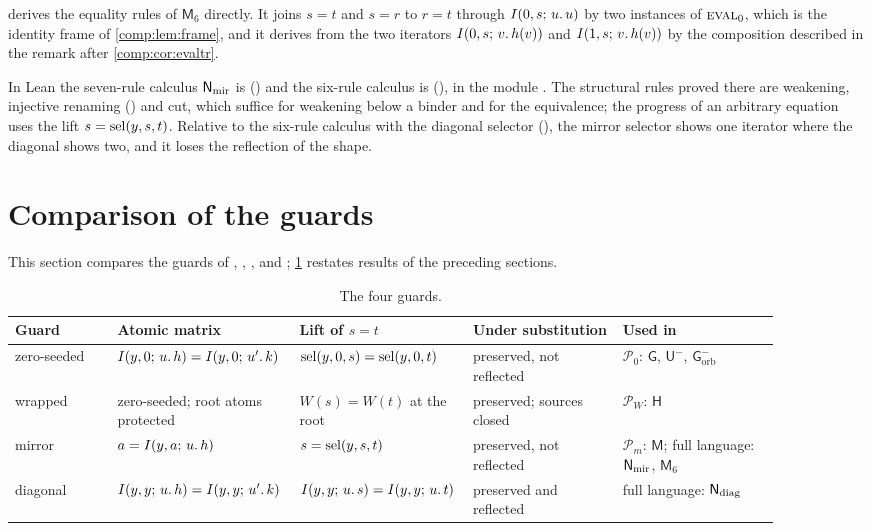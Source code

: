 \begin{remark}
\label{guard:rem:m6-versions}
 derives the equality rules of $\mathsf M_6$ directly.
It joins $s=t$ and $s=r$ to $r=t$ through $I(0,s;\,u.\,u)$ by two
instances of $\rulename{Eval}_0$, which is the identity frame of
\cref{comp:lem:frame}, and it derives  from the two iterators
$I(0,s;\,v.\,h(v))$ and $I(1,s;\,v.\,h(v))$ by the composition described
in the remark after \cref{comp:cor:evaltr}.
\end{remark}

In Lean the seven-rule calculus $\mathsf{N}_{\mathrm{mir}}$ is 
() and the six-rule calculus is 
(), in the module .  The
structural rules proved there are weakening, injective renaming
() and cut, which suffice for weakening below a binder and
for the equivalence; the progress of an arbitrary equation uses the lift
$s=\operatorname{sel}(y,s,t)$.  Relative to the six-rule calculus with the diagonal
selector (), the mirror selector shows one iterator where the
diagonal shows two, and it loses the reflection of the shape.

\section{Comparison of the guards}
\label{guard:sec:compare}

This section compares the guards of ,
, ,  and
; \cref{guard:tab:guards} restates results of the
preceding sections.

\begin{table}[ht]
\centering
\small
\begin{tabular}{@{}p{0.13\linewidth}p{0.2\linewidth}p{0.17\linewidth}p{0.19\linewidth}p{0.2\linewidth}@{}}
\toprule
Guard & Atomic matrix & Lift of $s=t$ & Under substitution & Used in\\
\midrule
zero-seeded & $I(y,0;\,u.\,h)=I(y,0;\,u'.\,k)$ &
 $\operatorname{sel}(y,0,s)=\operatorname{sel}(y,0,t)$ &
 preserved, not reflected &
 $\mathcal P_0$: $\mathsf G$, $\mathsf U^{-}$,
 $\mathsf G^{-}_{\mathrm{orb}}$\\
wrapped & zero-seeded; root atoms protected &
 $W(s)=W(t)$ at the root &
 preserved; sources closed &
 $\mathcal P_W$: $\mathsf H$\\
mirror & $a=I(y,a;\,u.\,h)$ &
 $s=\operatorname{sel}(y,s,t)$ &
 preserved, not reflected &
 $\mathcal P_m$: $\mathsf M$; full language:
 $\mathsf{N}_{\mathrm{mir}}$, $\mathsf M_6$\\
diagonal & $I(y,y;\,u.\,h)=I(y,y;\,u'.\,k)$ &
 $I(y,y;\,u.\,s)=I(y,y;\,u.\,t)$ &
 preserved and reflected &
 full language: $\mathsf{N}_{\mathrm{diag}}$\\
\bottomrule
\end{tabular}
\caption{The four guards.}
\label{guard:tab:guards}
\end{table}

